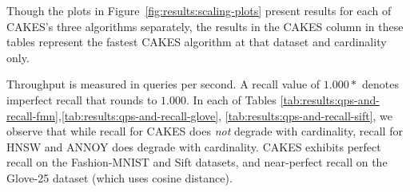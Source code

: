 Though the plots in Figure~\ref{fig:results:scaling-plots} present results for each of CAKES's three algorithms separately, the results in the CAKES column in these tables represent the fastest CAKES algorithm at that dataset and cardinality only.

Throughput is measured in queries per second.
A recall value of $1.000*$ denotes imperfect recall that rounds to $1.000$.
In each of Tables \ref{tab:results:qps-and-recall-fmn},\ref{tab:results:qps-and-recall-glove}, \ref{tab:results:qps-and-recall-sift}, we observe that while recall for CAKES does \emph{not} degrade with cardinality, recall for
HNSW and ANNOY does degrade with cardinality. CAKES exhibits perfect recall on the Fashion-MNIST and Sift datasets, and near-perfect recall on the Glove-25 dataset (which uses cosine distance).








